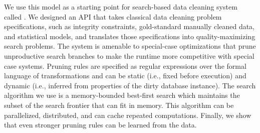 We use this model as a starting point for search-based data cleaning system called \sys.
We designed an API that takes classical data cleaning problem specifications, such as integrity constraints, gold-standard manually cleaned data, and statistical models, and translates those specifications into quality-maximizing search problems. 
The system is amenable to special-case optimizations that prune unproductive search branches to make the runtime more competitive with special case systems.
Pruning rules are specified as regular expressions over the formal language of transformations and can be static (i.e., fixed before execution) and dynamic (i.e., inferred from properties of the dirty database instance).
The search algorithm we use is a memory-bounded best-first search which maintains the subset of the search frontier that can fit in memory. 
This algorithm can be parallelized, distributed, and can cache repeated computations.
Finally, we show that even stronger pruning rules can be learned from the data.